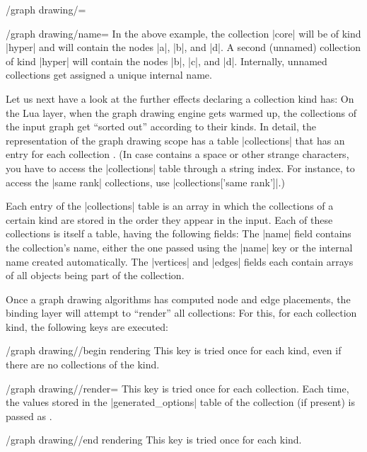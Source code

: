 \begin{command}{\pgfgddeclarecollectionkind{}}
\begin{key}{/graph drawing/=}
\begin{key}{/graph drawing/name=}
      In the above example, the collection |core| will be of kind |hyper|
      and will contain the nodes |a|, |b|, and |d|. A second (unnamed)
      collection of kind |hyper| will contain the nodes |b|, |c|, and
      |d|. Internally, unnamed collections get assigned a unique internal
      name.
    \end{key}
  \end{key}

  Let us next have a look at the further effects declaring a
  collection kind has: On the Lua layer, when the graph drawing engine
  gets warmed up, the collections of the input graph get ``sorted out''
  according to their kinds. In detail, the representation of the graph
  drawing scope has a table |collections| that has an entry for each
  collection . (In case  contains a space or
  other strange characters, you have to access the |collections| table
  through a string index. For instance, to access the |same rank|
  collections, use |collections['same rank']|.)
    
  Each entry of the |collections| table is an array in which the
  collections of a certain kind are stored in the order they appear in
  the input. Each of these collections is itself a table, having the
  following fields: The |name| field contains the collection's name,
  either the one passed using the |name| key or the internal name
  created automatically. The |vertices| and |edges| fields each
  contain arrays of all objects being part of the collection.

  Once a graph drawing algorithms has computed node and edge
  placements, the binding layer will attempt to ``render'' all
  collections: For this, for each collection kind, the following keys
  are executed:

  \begin{key}{/graph drawing//begin rendering}
    This key is tried once for each kind, even if there are no
    collections of the kind.
  \end{key}
  \begin{key}{/graph drawing//render=}
    This key is tried once for each collection. Each time, the values
    stored in the |generated_options| table of the collection (if
    present) is passed as .
  \end{key}
  \begin{key}{/graph drawing//end rendering}
    This key is tried once for each kind.
  \end{key}
  

\end{command}
